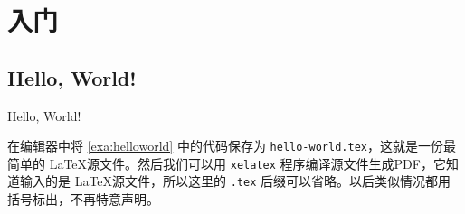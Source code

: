 \chapter{入门}

\section{Hello, World!}
\begin{example}[h]
\caption{Hello, World!}
\label{exa:helloworld}
\end{example}

在编辑器中将 \autoref{exa:helloworld} 中的代码保存为 \verb|hello-world.tex|，这就是一份最简单的 \LaTeX 源文件。然后我们可以用 \texttt{xelatex} 程序编译源文件生成PDF，它知道输入的是 \LaTeX 源文件，所以这里的 \texttt{.tex} 后缀可以省略。以后类似情况都用括号标出，不再特意声明。
